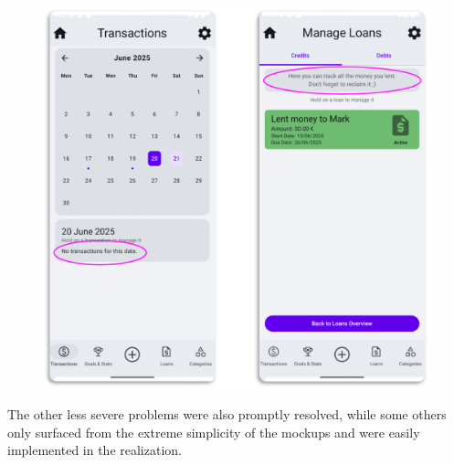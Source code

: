 \documentclass[a4paper,12pt]{article}
\begin{document}
\begin{figure}[H]
    \centering
    \includegraphics[scale=0.6]{HEres2.png}
\end{figure}
The other less severe problems were also promptly resolved, while some others only surfaced from the extreme simplicity of the mockups and were easily implemented in the realization.
\end{document}
